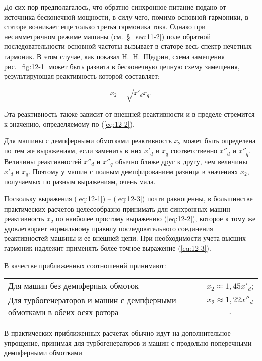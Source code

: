 До сих пор предполагалось, что обратно-синхронное питание подано от источника бесконечной мощности, в силу чего, помимо основной гармоники, в статоре возникает еще только третья гармоника тока. Однако при несимметричном режиме машины (см.~§~\ref{sec:11-2}) поле обратной последовательности основной частоты вызывает в статоре весь спектр нечетных гармоник. В этом случае, как показал Н.~Н.~Щедрин, схема замещения рис.~\ref{fig:12-1} может быть развита в бесконечную цепную схему замещения, результирующая реактивность которой составляет:

\begin{equation}
	x_{2}  = \sqrt{x'_d x_q} \text{.}
	\label{eq:12-3}
\end{equation}

Эта реактивность также зависит от внешней реактивности и в пределе стремится к значению, определяемому по (\ref{eq:12-2}).

Для машины с демпферными обмотками реактивность $ x_2 $ может быть определена по тем же выражениям, если заменить в них $ x'_d $ и $ x_q $ соответственно $ x''_d $ и $ x''_q $. Величины реактивностей $ x''_d $ и $ x''_q $ обычно ближе друг к другу, чем величины $ x'_d $ и $ x_q $. Поэтому у машин с полным демпфированием разница в значениях $ x_2 $, получаемых по разным выражениям, очень мала.

Поскольку выражения (\ref{eq:12-1}) -- (\ref{eq:12-3}) почти равноценны, в большинстве практических расчетов целесообразно принимать для синхронных машин реактивность $ x_2 $ по наиболее простому выражению (\ref{eq:12-2}), которое к тому же удовлетворяет нормальному правилу последовательного соединения реактивностей машины и ее внешней цепи. При необходимости учета высших гармоник надлежит применять более точное выражение (\ref{eq:12-3}).

В качестве приближенных соотношений принимают:

\begin{tabular}{lc}
	Для машин без демпферных обмоток & $ x_2 \approx 1,45 x'_d  $; \\ 
	Для турбогенераторов и машин с демпферными обмотками в обеих осях ротора &  $ x_2 \approx 1,22 x''_d  $. \\ 
\end{tabular} 

В практических приближенных расчетах обычно идут на дополнительное упрощение, принимая для турбогенераторов и машин с продольно-поперечными демпферными обмотками

